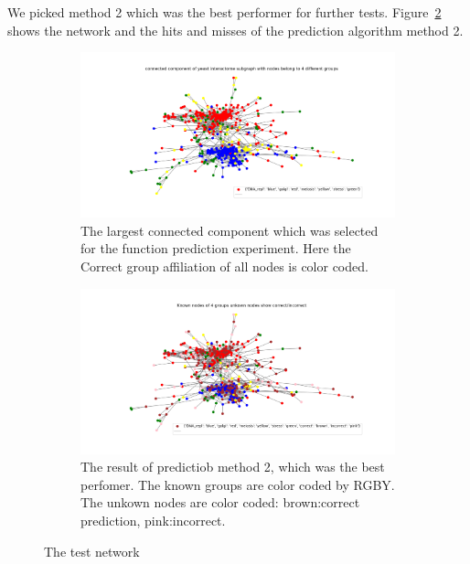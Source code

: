 We picked method 2 which was the best performer for further tests.
Figure~\ref{fig:largest_connected_comp}
shows the network and the hits and misses of the prediction
algorithm method 2.

\begin{figure}[!htb]
\begin{framed}
\centering
\begin{subfigure}[b]{\textwidth}
\includegraphics[width=\textwidth]{figures/connected component of yeast interactome subgraph with nodes belong to 4 different groups.png}
\caption{The largest connected component which was selected for the function
prediction experiment. Here the Correct group affiliation of all nodes is color
coded.}
\end{subfigure}
\begin{subfigure}[b]{\textwidth}
\includegraphics[width=\textwidth]{figures/method2_true_false_clustering_on_4_groups_with_ordering_and_update.png}
\caption{The result of predictiob method 2, which was the best perfomer. 
The known groups are color coded by RGBY. The unkown nodes are color
coded: brown:correct prediction, pink:incorrect.}
\label{fig:my_prediction}
\end{subfigure}
\caption{The test network}
\label{fig:largest_connected_comp}
\end{framed}
\end{figure}

